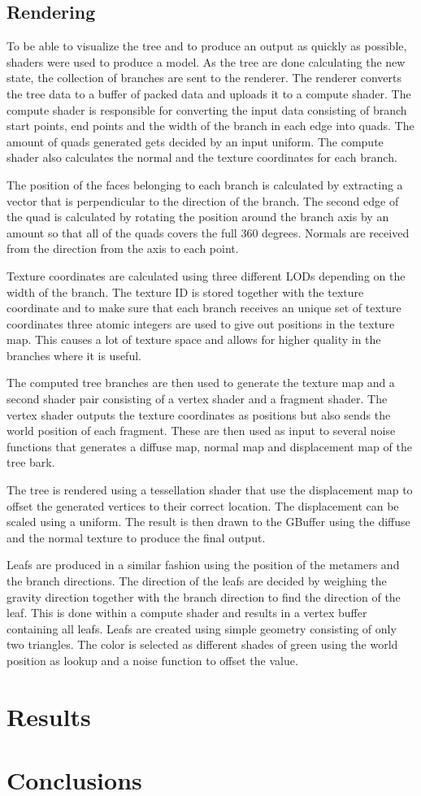 \documentclass[11pt]{article} %
\begin{document}
\subsection{Rendering}
To be able to visualize the tree and to produce an output as quickly as possible, shaders were used to produce a model.
As the tree are done calculating the new state, the collection of branches are sent to the renderer.
The renderer converts the tree data to a buffer of packed data and uploads it to a compute shader.
The compute shader is responsible for converting the input data consisting of branch start points, end points and the width of the branch in each edge into quads.
The amount of quads generated gets decided by an input uniform.
The compute shader also calculates the normal and the texture coordinates for each branch.

The position of the faces belonging to each branch is calculated by extracting a vector that is perpendicular to the direction of the branch.
The second edge of the quad is calculated by rotating the position around the branch axis by an amount so that all of the quads covers the full 360 degrees.
Normals are received from the direction from the axis to each point.

Texture coordinates are calculated using three different LODs depending on the width of the branch.
The texture ID is stored together with the texture coordinate and to make sure that each branch receives an unique set of texture coordinates three atomic integers are used to give out positions in the texture map.
This causes a lot of texture space and allows for higher quality in the branches where it is useful.

The computed tree branches are then used to generate the texture map and a second shader pair consisting of a vertex shader and a fragment shader.
The vertex shader outputs the texture coordinates as positions but also sends the world position of each fragment.
These are then used as input to several noise functions that generates a diffuse map, normal map and displacement map of the tree bark.

The tree is rendered using a tessellation shader that use the displacement map to offset the generated vertices to their correct location.
The displacement can be scaled using a uniform.
The result is then drawn to the GBuffer using the diffuse and the normal texture to produce the final output.

Leafs are produced in a similar fashion using the position of the metamers and the branch directions.
The direction of the leafs are decided by weighing the gravity direction together with the branch direction to find the direction of the leaf.
This is done within a compute shader and results in a vertex buffer containing all leafs.
Leafs are created using simple geometry consisting of only two triangles.
The color is selected as different shades of green using the world position as lookup and a noise function to offset the value.

\section{Results}

\section{Conclusions}



\end{document}

